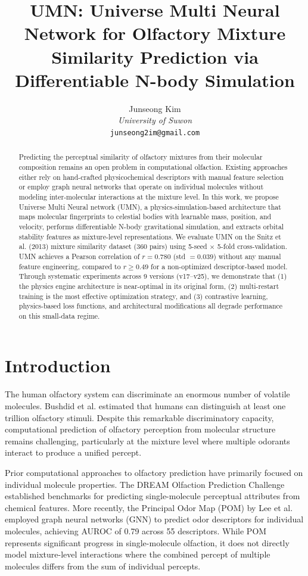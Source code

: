 \documentclass[11pt,a4paper]{article}
\title{UMN: Universe Multi Neural Network for Olfactory Mixture Similarity Prediction via Differentiable N-body Simulation}
\author{Junseong Kim\\
\textit{University of Suwon}\\
\texttt{junseong2im@gmail.com}}
\date{}
\begin{document}
\maketitle

\begin{abstract}
Predicting the perceptual similarity of olfactory mixtures from their molecular composition remains an open problem in computational olfaction. Existing approaches either rely on hand-crafted physicochemical descriptors with manual feature selection or employ graph neural networks that operate on individual molecules without modeling inter-molecular interactions at the mixture level. In this work, we propose Universe Multi Neural network (UMN), a physics-simulation-based architecture that maps molecular fingerprints to celestial bodies with learnable mass, position, and velocity, performs differentiable N-body gravitational simulation, and extracts orbital stability features as mixture-level representations. We evaluate UMN on the Snitz et al. (2013) mixture similarity dataset (360 pairs) using 5-seed $\times$ 5-fold cross-validation. UMN achieves a Pearson correlation of $r = 0.780$ (std $= 0.039$) without any manual feature engineering, compared to $r \geq 0.49$ for a non-optimized descriptor-based model. Through systematic experiments across 9 versions (v17--v25), we demonstrate that (1) the physics engine architecture is near-optimal in its original form, (2) multi-restart training is the most effective optimization strategy, and (3) contrastive learning, physics-based loss functions, and architectural modifications all degrade performance on this small-data regime.
\end{abstract}

\section{Introduction}

The human olfactory system can discriminate an enormous number of volatile molecules. Bushdid et al. \cite{bushdid2014} estimated that humans can distinguish at least one trillion olfactory stimuli. Despite this remarkable discriminatory capacity, computational prediction of olfactory perception from molecular structure remains challenging, particularly at the mixture level where multiple odorants interact to produce a unified percept.

Prior computational approaches to olfactory prediction have primarily focused on individual molecule properties. The DREAM Olfaction Prediction Challenge \cite{keller2017} established benchmarks for predicting single-molecule perceptual attributes from chemical features. More recently, the Principal Odor Map (POM) by Lee et al. \cite{lee2023} employed graph neural networks (GNN) to predict odor descriptors for individual molecules, achieving AUROC of 0.79 across 55 descriptors. While POM represents significant progress in single-molecule olfaction, it does not directly model mixture-level interactions where the combined percept of multiple molecules differs from the sum of individual percepts.
\end{document}
